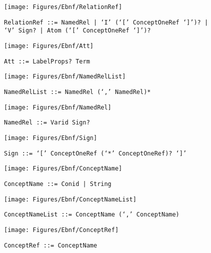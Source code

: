  \begin{figure}[H]
  \centering
  \texttt{[image: Figures/Ebnf/RelationRef]}
  \caption*{\texttt{RelationRef \small::=  NamedRel | `I' (`[' ConceptOneRef `]')? | `V' Sign? | Atom (`[' ConceptOneRef `]')?}}
  \label{fig:ebnf-RelationRef}
 \end{figure}

 \begin{figure}[H]
  \centering
  \texttt{[image: Figures/Ebnf/Att]}
  \caption*{\texttt{Att \small::=  LabelProps? Term}}
  \label{fig:ebnf-Att}
 \end{figure}

 \begin{figure}[H]
  \centering
  \texttt{[image: Figures/Ebnf/NamedRelList]}
  \caption*{\texttt{NamedRelList \small::=  NamedRel (`,' NamedRel)*}}
  \label{fig:ebnf-NamedRelList}
 \end{figure}

 \begin{figure}[H]
  \centering
  \texttt{[image: Figures/Ebnf/NamedRel]}
  \caption*{\texttt{NamedRel \small::=  Varid Sign?}}
  \label{fig:ebnf-NamedRel}
 \end{figure}

 \begin{figure}[H]
  \centering
  \texttt{[image: Figures/Ebnf/Sign]}
  \caption*{\texttt{Sign \small::=  `[' ConceptOneRef (`*' ConceptOneRef)? `]'}}
  \label{fig:ebnf-Sign}
 \end{figure}

 \begin{figure}[H]
  \centering
  \texttt{[image: Figures/Ebnf/ConceptName]}
  \caption*{\texttt{ConceptName \small::=  Conid | String}}
  \label{fig:ebnf-ConceptName}
 \end{figure}

 \begin{figure}[H]
  \centering
  \texttt{[image: Figures/Ebnf/ConceptNameList]}
  \caption*{\texttt{ConceptNameList \small::=  ConceptName (`,' ConceptName)}}
  \label{fig:ebnf-ConceptNameList}
 \end{figure}

 \begin{figure}[H]
  \centering
  \texttt{[image: Figures/Ebnf/ConceptRef]}
  \caption*{\texttt{ConceptRef \small::=  ConceptName}}
  \label{fig:ebnf-ConceptRef}
 \end{figure}

